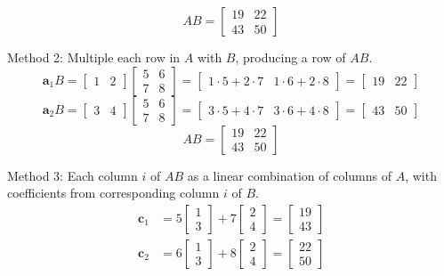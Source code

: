 \documentclass[../linear-algebra.tex]{subfiles}
\begin{document}
\[
AB = \begin{bmatrix}
19 & 22 \\
43 & 50
\end{bmatrix}
\]

\noindent Method 2: Multiple each row in $A$ with $B$, producing a row of $AB$.
\[
\bm{a}_1B = 
\begin{bmatrix} 1 & 2 \end{bmatrix} \begin{bmatrix} 5 & 6 \\ 7 & 8 \end{bmatrix} = 
\begin{bmatrix} 1\cdot5 + 2\cdot7 & 1\cdot6 + 2\cdot8 \end{bmatrix} = 
\begin{bmatrix} 19 & 22 \end{bmatrix}
\]
\[
\bm{a}_2B = 
\begin{bmatrix} 3 & 4 \end{bmatrix} \begin{bmatrix} 5 & 6 \\ 7 & 8 \end{bmatrix} = 
\begin{bmatrix} 3\cdot5 + 4\cdot7 & 3\cdot6 + 4\cdot8 \end{bmatrix} = 
\begin{bmatrix} 43 & 50 \end{bmatrix}
\]
\[
AB = 
\begin{bmatrix} 19 & 22 \\ 43 & 50 \end{bmatrix}
\]


\noindent Method 3: Each column $i$ of $AB$ as a linear combination of columns of $A$, with coefficients from corresponding column $i$ of $B$.
\[\begin{aligned}
\bm{c}_1 &= 5 \begin{bmatrix} 1 \\ 3 \end{bmatrix} + 7 \begin{bmatrix} 2 \\ 4 \end{bmatrix}
= \begin{bmatrix} 19 \\ 43 \end{bmatrix}
\end{aligned}\]
\[\begin{aligned}
\bm{c}_2 &= 6 \begin{bmatrix} 1 \\ 3 \end{bmatrix} + 8 \begin{bmatrix} 2 \\ 4 \end{bmatrix}
= \begin{bmatrix} 22 \\ 50 \end{bmatrix}
\end{aligned}\]
\end{document}
